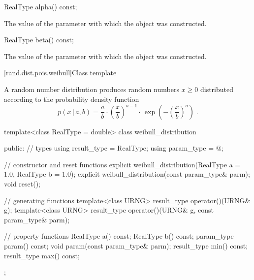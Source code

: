 %
%
\begin{itemdecl}
RealType alpha() const;
\end{itemdecl}

\begin{itemdescr}
\pnum\returns The value of the  parameter
 with which the object was constructed.
\end{itemdescr}

%
%
\begin{itemdecl}
RealType beta() const;
\end{itemdecl}

\begin{itemdescr}
\pnum\returns The value of the  parameter
 with which the object was constructed.
\end{itemdescr}


[rand.dist.pois.weibull]{Class template }%

\pnum
A  random number distribution
produces random numbers $x \geq 0$
distributed according to
the probability density function%
%
\[%
 p(x\,|\,a,b)
      =       \frac{a}{b}
        \cdot \left(\frac{x}{b}\right)^{a-1}
        \cdot \, \exp\left( -\left(\frac{x}{b}\right)^a\right)
\; \mbox{.}
\]

\begin{codeblock}
template<class RealType = double>
 class weibull_distribution
{
public:
 // types
 using result_type = RealType;
 using param_type  = @\unspec@;

 // constructor and reset functions
 explicit weibull_distribution(RealType a = 1.0, RealType b = 1.0);
 explicit weibull_distribution(const param_type& parm);
 void reset();

 // generating functions
 template<class URNG>
   result_type operator()(URNG& g);
 template<class URNG>
   result_type operator()(URNG& g, const param_type& parm);

 // property functions
 RealType a() const;
 RealType b() const;
 param_type param() const;
 void param(const param_type& parm);
 result_type min() const;
 result_type max() const;
};
\end{codeblock}

